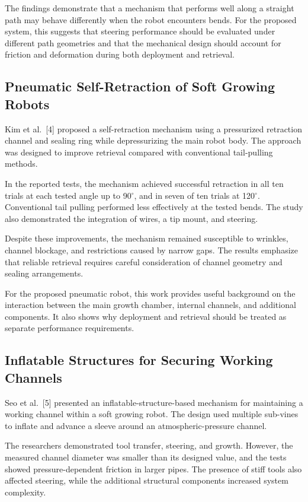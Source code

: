 The findings demonstrate that a mechanism that performs well along a straight path may behave differently when the robot encounters bends. For the proposed system, this suggests that steering performance should be evaluated under different path geometries and that the mechanical design should account for friction and deformation during both deployment and retrieval.

\subsection{Pneumatic Self-Retraction of Soft Growing Robots}

Kim et al.~[4] proposed a self-retraction mechanism using a pressurized retraction channel and sealing ring while depressurizing the main robot body. The approach was designed to improve retrieval compared with conventional tail-pulling methods.

In the reported tests, the mechanism achieved successful retraction in all ten trials at each tested angle up to 90$^\circ$, and in seven of ten trials at 120$^\circ$. Conventional tail pulling performed less effectively at the tested bends. The study also demonstrated the integration of wires, a tip mount, and steering.

Despite these improvements, the mechanism remained susceptible to wrinkles, channel blockage, and restrictions caused by narrow gaps. The results emphasize that reliable retrieval requires careful consideration of channel geometry and sealing arrangements.

For the proposed pneumatic robot, this work provides useful background on the interaction between the main growth chamber, internal channels, and additional components. It also shows why deployment and retrieval should be treated as separate performance requirements.

\subsection{Inflatable Structures for Securing Working Channels}

Seo et al.~[5] presented an inflatable-structure-based mechanism for maintaining a working channel within a soft growing robot. The design used multiple sub-vines to inflate and advance a sleeve around an atmospheric-pressure channel.

The researchers demonstrated tool transfer, steering, and growth. However, the measured channel diameter was smaller than its designed value, and the tests showed pressure-dependent friction in larger pipes. The presence of stiff tools also affected steering, while the additional structural components increased system complexity.

